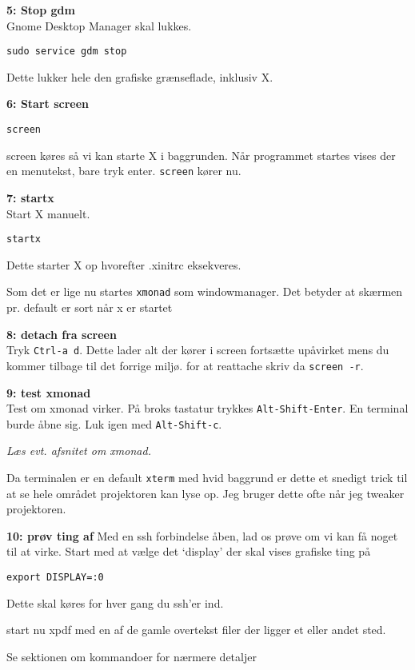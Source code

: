 \documentclass[10pt,a4paper,danish]{article}
\newcommand{\code}[1]{\colorbox{verbgray}{\texttt{#1}}}
\begin{document}
\textbf{5: Stop gdm}\\
Gnome Desktop Manager skal lukkes.
\begin{verbatim}
sudo service gdm stop
\end{verbatim}
Dette lukker hele den grafiske grænseflade, inklusiv X.

\textbf{6: Start screen}\\
\begin{verbatim}
screen
\end{verbatim}
screen køres så vi kan starte X i baggrunden.
Når programmet startes vises der en menutekst, bare tryk enter.
\texttt{screen} kører nu.

\textbf{7: startx}\\
Start X manuelt.
\begin{verbatim}
startx
\end{verbatim}
Dette starter X op hvorefter .xinitrc eksekveres.

Som det er lige nu startes \texttt{xmonad} som windowmanager.
Det betyder at skærmen pr. default er sort når x er startet


\textbf{8: detach fra screen}\\
Tryk \texttt{Ctrl-a d}. Dette lader alt der kører i screen fortsætte upåvirket
mens du kommer tilbage til det forrige miljø.
for at reattache skriv da \code{screen -r}.

\textbf{9: test xmonad}\\
Test om xmonad virker. På broks tastatur trykkes \texttt{Alt-Shift-Enter}.
En terminal burde åbne sig.
Luk igen med \texttt{Alt-Shift-c}.

\textit{Læs evt. afsnitet om xmonad.}

Da terminalen er en default \texttt{xterm} med hvid baggrund er dette et snedigt trick
til at se hele området projektoren kan lyse op.
Jeg bruger dette ofte når jeg tweaker projektoren.



\textbf{10: prøv ting af}
Med en ssh forbindelse åben, lad os prøve om vi kan få noget til at virke.
Start med at vælge det `display' der skal vises grafiske ting på
\begin{verbatim}
export DISPLAY=:0
\end{verbatim}
Dette skal køres for hver gang du ssh'er ind.

start nu xpdf med en af de gamle overtekst filer der ligger et eller andet sted.

Se sektionen om kommandoer for nærmere detaljer
\end{document}

